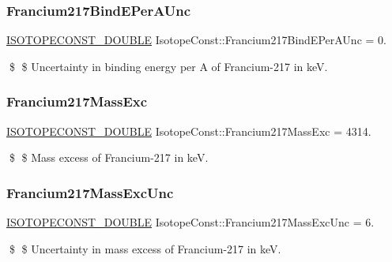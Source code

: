\subsubsection{\texorpdfstring{Francium217\+Bind\+E\+Per\+A\+Unc}{Francium217BindEPerAUnc}}
{\footnotesize\ttfamily \mbox{\hyperlink{group___isotope_const-_macros_ga8f45a7272ce02c0b4c65c44636ed719a}{I\+S\+O\+T\+O\+P\+E\+C\+O\+N\+S\+T\+\_\+\+D\+O\+U\+B\+LE}} Isotope\+Const\+::\+Francium217\+Bind\+E\+Per\+A\+Unc = 0.}

\$ \$ Uncertainty in binding energy per A of Francium-\/217 in keV. \mbox{\label{group___isotope_const-_francium-_fr217_ga7a247d052ab9053460dff553d721cded}} 
\subsubsection{\texorpdfstring{Francium217\+Mass\+Exc}{Francium217MassExc}}
{\footnotesize\ttfamily \mbox{\hyperlink{group___isotope_const-_macros_ga8f45a7272ce02c0b4c65c44636ed719a}{I\+S\+O\+T\+O\+P\+E\+C\+O\+N\+S\+T\+\_\+\+D\+O\+U\+B\+LE}} Isotope\+Const\+::\+Francium217\+Mass\+Exc = 4314.}

\$ \$ Mass excess of Francium-\/217 in keV. \mbox{\label{group___isotope_const-_francium-_fr217_ga35421fad4e6cccf61858a58d74ded5ef}} 
\subsubsection{\texorpdfstring{Francium217\+Mass\+Exc\+Unc}{Francium217MassExcUnc}}
{\footnotesize\ttfamily \mbox{\hyperlink{group___isotope_const-_macros_ga8f45a7272ce02c0b4c65c44636ed719a}{I\+S\+O\+T\+O\+P\+E\+C\+O\+N\+S\+T\+\_\+\+D\+O\+U\+B\+LE}} Isotope\+Const\+::\+Francium217\+Mass\+Exc\+Unc = 6.}

\$ \$ Uncertainty in mass excess of Francium-\/217 in keV. \mbox{\label{group___isotope_const-_francium-_fr217_gab43ef4515c104a9cc8adea6259d98af5}} 
